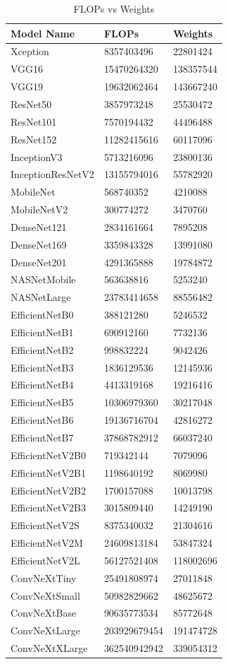 \begin{table}[H]
	\caption{FLOPs vs Weights}
	\label{table:flops_vs_weights}
	\centering
	\begin{tabular}{lll}
		\hline
		Model Name & FLOPs & Weights \\ 
		\hline \hline 
		Xception & 8357403496 & 22801424 \\ 
		VGG16 & 15470264320 & 138357544 \\ 
		VGG19 & 19632062464 & 143667240 \\ 
		ResNet50 & 3857973248 & 25530472 \\ 
		ResNet101 & 7570194432 & 44496488 \\ 
		ResNet152 & 11282415616 & 60117096 \\ 
		InceptionV3 & 5713216096 & 23800136 \\ 
		InceptionResNetV2 & 13155794016 & 55782920 \\ 
		MobileNet & 568740352 & 4210088 \\ 
		MobileNetV2 & 300774272 & 3470760 \\ 
		DenseNet121 & 2834161664 & 7895208 \\ 
		DenseNet169 & 3359843328 & 13991080 \\ 
		DenseNet201 & 4291365888 & 19784872 \\ 
		NASNetMobile & 563638816 & 5253240 \\ 
		NASNetLarge & 23783414658 & 88556482 \\ 
		EfficientNetB0 & 388121280 & 5246532 \\ 
		EfficientNetB1 & 690912160 & 7732136 \\ 
		EfficientNetB2 & 998832224 & 9042426 \\ 
		EfficientNetB3 & 1836129536 & 12145936 \\ 
		EfficientNetB4 & 4413319168 & 19216416 \\ 
		EfficientNetB5 & 10306979360 & 30217048 \\ 
		EfficientNetB6 & 19136716704 & 42816272 \\ 
		EfficientNetB7 & 37868782912 & 66037240 \\ 
		EfficientNetV2B0 & 719342144 & 7079096 \\ 
		EfficientNetV2B1 & 1198640192 & 8069980 \\ 
		EfficientNetV2B2 & 1700157088 & 10013798 \\ 
		EfficientNetV2B3 & 3015809440 & 14249190 \\ 
		EfficientNetV2S & 8375340032 & 21304616 \\ 
		EfficientNetV2M & 24609813184 & 53847324 \\ 
		EfficientNetV2L & 56127521408 & 118002696 \\ 
		ConvNeXtTiny & 25491808974 & 27011848 \\ 
		ConvNeXtSmall & 50982829662 & 48625672 \\ 
		ConvNeXtBase & 90635773534 & 85772648 \\ 
		ConvNeXtLarge & 203929679454 & 191474728 \\ 
		ConvNeXtXLarge & 362540942942 & 339054312 \\ 
		\hline
	\end{tabular}
\end{table}

